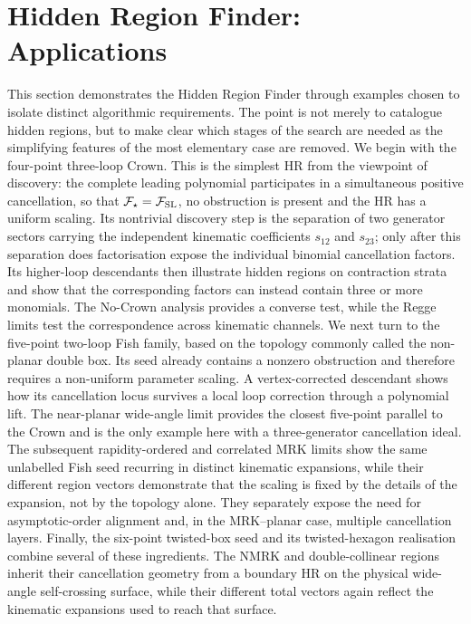 \documentclass[a4paper,11pt]{article}
\newcommand{\FSL}{\mathcal F_{\rm SL}}
\begin{document}
\section{Hidden Region Finder: Applications}
\label{sec:applications}

This section demonstrates the Hidden Region Finder through examples chosen to
isolate distinct algorithmic requirements.  The point is not merely to
catalogue hidden regions, but to make clear which stages of the search are
needed as the simplifying features of the most elementary case are removed.
We begin with the four-point three-loop Crown.  This is the simplest HR from
the viewpoint of discovery: the complete leading polynomial participates in a
simultaneous positive cancellation, so that \(\mathcal F_\star=\FSL\), no
obstruction is present and the HR has a uniform scaling.  Its nontrivial
discovery step is the separation of two generator sectors carrying the
independent kinematic coefficients \(s_{12}\) and \(s_{23}\); only after this
separation does factorisation expose the individual binomial cancellation
factors.  Its higher-loop descendants then illustrate hidden regions on
contraction strata and show that the corresponding factors can instead contain
three or more monomials.  The No-Crown analysis provides a converse test, while the Regge
limits test the correspondence across kinematic channels.  We next turn to
the five-point two-loop Fish family, based on the topology commonly called
the non-planar double box.  Its seed already contains a nonzero obstruction
and therefore requires a non-uniform parameter scaling.  A
vertex-corrected descendant shows how its cancellation locus survives a local
loop correction through a polynomial lift.  The near-planar wide-angle limit
provides the closest five-point parallel to the Crown and is the only example
here with a three-generator cancellation ideal.  The subsequent
rapidity-ordered and correlated MRK limits show the same unlabelled Fish seed
recurring in distinct kinematic expansions, while their different region
vectors demonstrate that the scaling is fixed by the details of the expansion,
not by the topology alone.  They separately expose the need for
asymptotic-order alignment and, in the MRK--planar case, multiple cancellation
layers.  Finally, the six-point twisted-box seed and its twisted-hexagon
realisation combine several of these ingredients.  The NMRK and
double-collinear regions inherit their cancellation geometry from a boundary
HR on the physical wide-angle self-crossing surface, while their different
total vectors again reflect the kinematic expansions used to reach that
surface.
\end{document}
